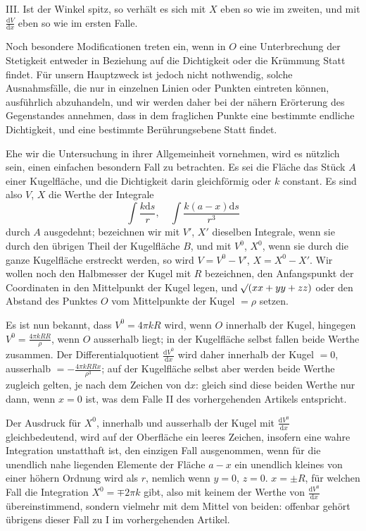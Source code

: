 III. Ist der Winkel spitz, so verhält es sich mit $X$ eben so wie im zweiten, und mit $\frac{\mathrm{d}V}{\mathrm{d}x}$ eben so wie im ersten Falle.

Noch besondere Modificationen treten ein, wenn in $O$ eine Unterbrechung der Stetigkeit entweder in Beziehung auf die Dichtigkeit oder die Krümmung Statt findet. Für unsern Hauptzweck ist jedoch nicht nothwendig, solche Ausnahmsfälle, die nur in einzelnen Linien oder Punkten eintreten können, ausführlich abzuhandeln, und wir werden daher bei der nähern Erörterung des Gegenstandes annehmen, dass in dem fraglichen Punkte eine bestimmte endliche Dichtigkeit, und eine bestimmte Berührungsebene Statt findet.

Ehe wir die Untersuchung in ihrer Allgemeinheit vornehmen, wird es nützlich sein, einen einfachen besondern Fall zu betrachten. Es sei die Fläche das Stück $A$ einer Kugelfläche, und die Dichtigkeit darin gleichförmig oder $k$ constant. Es sind also $V$, $X$ die Werthe der Integrale
%
\[
\int\frac{k\mathrm{d}s}{r},\quad\int\frac{k(a-x)\mathrm{d}s}{r^3}
\]
durch $A$ ausgedehnt; bezeichnen wir mit $V'$, $X'$ dieselben Integrale, wenn sie durch den übrigen Theil der Kugelfläche $B$, und mit $V^0$, $X^0$, wenn sie durch die ganze Kugelfläche erstreckt werden, so wird $V=V^0-V'$, $X=X^0-X'$. Wir wollen noch den Halbmesser der Kugel mit $R$ bezeichnen, den Anfangspunkt der Coordinaten in den Mittelpunkt der Kugel legen, und $\mathord{{}^{}\!\surd}(xx+yy+zz)$ oder den Abstand des Punktes $O$ vom Mittelpunkte der Kugel $=\rho$ setzen.

Es ist nun bekannt, dass $V^0=4\pi kR$ wird, wenn $O$ innerhalb der Kugel, hingegen $V^0=\frac{4\pi kRR}{\rho}$, wenn $O$ ausserhalb liegt; in der Kugelfläche selbst fallen beide Werthe zusammen. Der Differentialquotient $\frac{\mathrm{d}V^0}{\mathrm{d}x}$ wird daher innerhalb der Kugel $=0$, ausserhalb $=-\frac{4\pi kRRx}{\rho^3}$; auf der Kugelfläche selbst aber werden beide Werthe zugleich gelten, je nach dem Zeichen von $\mathrm{d}x$: gleich sind diese beiden Werthe nur dann, wenn $x=0$ ist, was dem Falle II des vorhergehenden Artikels entspricht.

Der Ausdruck für $X^0$, innerhalb und ausserhalb der Kugel mit $\frac{\mathrm{d}V^0}{\mathrm{d}x}$ gleichbedeutend, wird auf der Oberfläche ein leeres Zeichen, insofern eine wahre Integration unstatthaft ist, den einzigen Fall ausgenommen, wenn für die unendlich nahe liegenden Elemente der Fläche $a-x$ ein unendlich kleines von einer höhern Ordnung wird als $r$, nemlich wenn $y=0$, $z=0$. $x=\pm R$, für welchen Fall die Integration $X^0=\mp2\pi k$ gibt, also mit keinem der Werthe von $\frac{\mathrm{d}V^0}{\mathrm{d}x}$ übereinstimmend, sondern vielmehr mit dem Mittel von beiden: offenbar gehört übrigens dieser Fall zu I im vorhergehenden Artikel.

